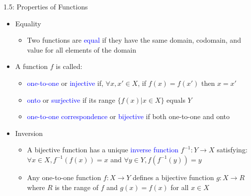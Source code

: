 \documentclass[10pt,english]{beamer}
\begin{document}
\begin{frame}{1.5: Properties of Functions}

\begin{itemize}
\setlength\itemsep{3mm}
\item<1-> Equality \vspace{1mm}
\begin{itemize}
  \setlength\itemsep{1.5mm}
  \item Two functions are \textcolor{blue}{equal} if they have the same domain, codomain, and value for all elements of the domain
\end{itemize}

\item<2-> A function $f$ is called: \vspace{1mm}
\begin{itemize}
  \setlength\itemsep{1.5mm}
  \item \textcolor{blue}{one-to-one} or \textcolor{blue}{injective} if, $\forall x,x'\in X$, if $f(x)=f(x')$ then $x=x'$
  \item \textcolor{blue}{onto} or \textcolor{blue}{surjective} if its range $\{ f(x) | x\in X\}$ equals $Y$
  \item \textcolor{blue}{one-to-one correspondence} or \textcolor{blue}{bijective} if both one-to-one and onto
\end{itemize}

\item<3-> Inversion \vspace{1mm}
\begin{itemize}
  \setlength\itemsep{1.5mm}
  \item A bijective function has a unique \textcolor{blue}{inverse function} $f^{-1} \colon Y\rightarrow X$ satisfying: $\forall x\in X, f^{-1}(f(x)) = x$ and $\forall y\in Y, f(f^{-1}(y)) = y$
  \item Any one-to-one function $f \colon X\rightarrow Y$ defines a bijective function $g \colon X \rightarrow R$ where $R$ is the range of $f$ and $g(x)=f(x)$ for all $x\in X$

\end{itemize}

\end{itemize}
\end{frame}    
\end{document}
